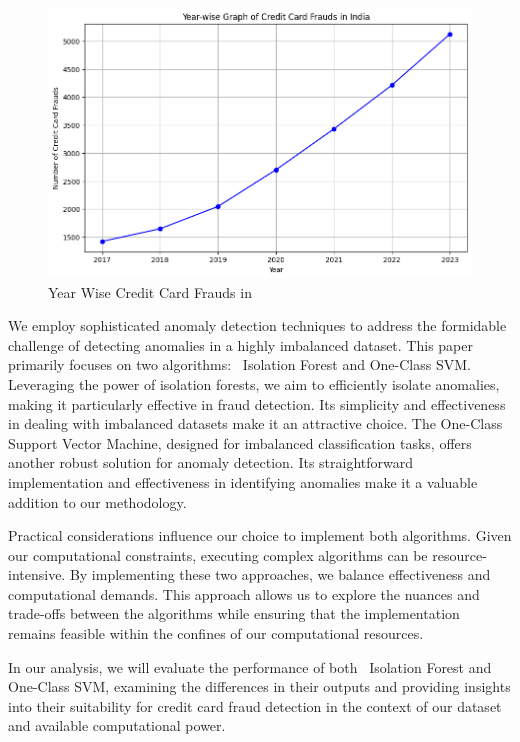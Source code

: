 \documentclass[journal]{IEEEtran}
\begin{document}
\begin{figure}
    \centering
    \includegraphics[width=0.9 \linewidth]{graph.png}
    \caption{Year Wise Credit Card Frauds in  \cite{livemint_card_frauds}}
    \label{fig:yearly data}
\end{figure}

We employ sophisticated anomaly detection techniques to address the formidable challenge of detecting anomalies in a highly imbalanced dataset. This paper primarily focuses on two algorithms: ~Isolation Forest\cite{isolationForest} and One-Class SVM\cite{One-classSVM}. Leveraging the power of isolation forests, we aim to efficiently isolate anomalies, making it particularly effective in fraud detection. Its simplicity and effectiveness in dealing with imbalanced datasets make it an attractive choice. The One-Class Support Vector Machine, designed for imbalanced classification tasks, offers another robust solution for anomaly detection. Its straightforward implementation and effectiveness in identifying anomalies make it a valuable addition to our methodology.

Practical considerations influence our choice to implement both algorithms. Given our computational constraints, executing complex algorithms can be resource-intensive. By implementing these two approaches, we balance effectiveness and computational demands. This approach allows us to explore the nuances and trade-offs between the algorithms while ensuring that the implementation remains feasible within the confines of our computational resources.
    
    In our analysis, we will evaluate the performance of both ~Isolation Forest and One-Class SVM, examining the differences in their outputs and providing insights into their suitability for credit card fraud detection in the context of our dataset and available computational power.
\end{document}
